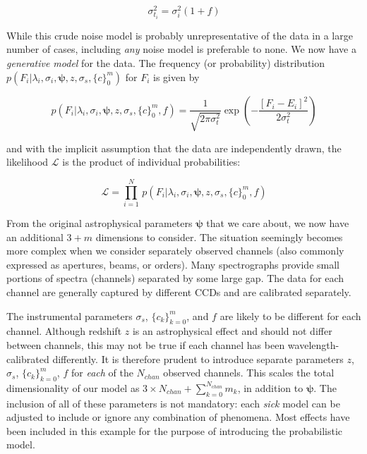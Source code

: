 \documentclass{aastex}
\newcommand{\sick}{\textit{sick}}
\begin{document}
\begin{equation}
\sigma_{t_i}^2 = \sigma_{i}^2(1 + f)
\end{equation}

While this crude noise model is probably unrepresentative of the data in a large number of cases, including \textit{any} noise model is preferable to none. We now have a \textit{generative model} for the data. The frequency (or probability) distribution ${p\left(F_i|\lambda_i,\sigma_i,\bm{\psi},z,\sigma_s,\{c\}_{0}^{m}\right)}$ for $F_i$ is given by

\begin{equation}
p\left(F_i|\lambda_i,\sigma_{i},\bm{\psi},z,\sigma_{s},\{c\}_{0}^{m},f\right) = 
 \frac{1}{\sqrt{2\pi\sigma_{t}^2}}\exp{\left(-\frac{\left[F_i - E_i\right]^2}{2\sigma_{t}^2}\right)}
 \label{eq:p_model}
\end{equation}

\noindent{}and with the implicit assumption that the data are independently drawn, the likelihood $\mathcal{L}$ is the product of individual probabilities:

\begin{equation}
\mathcal{L} = \prod_{i=1}^{N}\,p\left(F_i|\lambda_i,\sigma_{i},\bm{\psi},z,\sigma_{s},\{c\}_{0}^{m},f\right)
\end{equation}

From the original astrophysical parameters $\bm{\psi}$ that we care about, we now have an additional $3 + m$ dimensions to consider. The situation seemingly becomes more complex when we consider separately observed channels (also commonly expressed as apertures, beams, or orders). Many spectrographs provide small portions of spectra (channels) separated by some large gap. The data for each channel are generally captured by different CCDs and are calibrated separately. 

The instrumental parameters $\sigma_{s}$, $\{c_k\}_{k=0}^{m}$, and $f$ are likely to be different for each channel. Although redshift $z$ is an astrophysical effect and should not differ between channels, this may not be true if each channel has been wavelength-calibrated differently. It is therefore prudent to introduce separate parameters $z$, $\sigma_{s}$, $\{c_k\}_{k=0}^{m}$, $f$ for \textit{each} of the $N_{chan}$ observed channels. This scales the total dimensionality of our model as $3\times{}N_{chan} + \sum_{k=0}^{N_{chan}}m_{k}$, in addition to $\bm{\psi}$. The inclusion of all of these parameters is not mandatory: each \sick{} model can be adjusted to include or ignore any combination of phenomena. Most effects have been included in this example for the purpose of introducing the probabilistic model.
\end{document}

